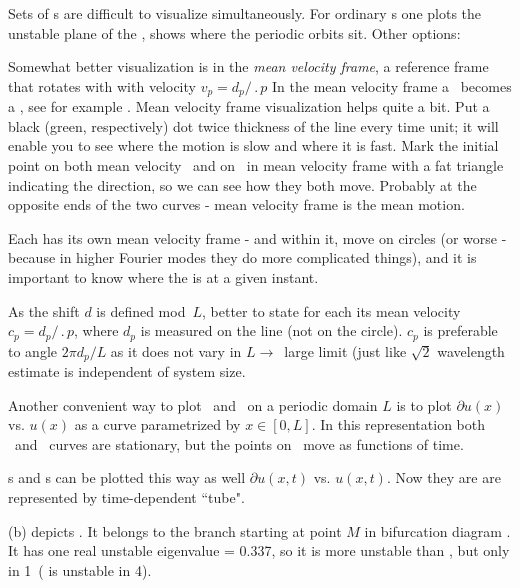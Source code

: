 Sets of \rpo s are difficult to visualize simultaneously.
For ordinary \po s one
plots the unstable plane of the \eqv, shows where the periodic
orbits sit. Other options:

Somewhat better visualization is in the
{\em mean velocity frame}, {\ie} 
a reference frame that rotates with with velocity 
$v_p=d_p/\period{p}$
In the mean velocity frame a \rpo\ becomes
a \po, see  for example .
Mean velocity frame visualization helps quite a bit.
Put a black (green, respectively) dot
twice thickness of the line every time unit; it will enable you to see
where the motion is slow and where it is fast.
Mark the initial point on both
mean velocity \rpo\ and on \eqv\  in mean velocity
 frame with a fat triangle
indicating the direction, so we can see how they both move. Probably at the
opposite ends of the two curves - mean velocity frame is the mean motion.


Each {\rpo} has its own mean velocity frame - and within it, {\eqv}
move on circles (or worse - because in higher Fourier modes they do more
complicated things), and it is important to know where the {\eqv} is at
a given instant.

As the shift $d$ is defined mod~$L$, better to
state for each {\rpo} its mean velocity $c_p = d_p/\period{p}$,
where $d_p$ is measured on the line (not on the circle). $c_p$ is
preferable to angle $2\pi d_p/L$ as it does not vary in $L \to$~large 
limit (just like $\sqrt{2}$ wavelength estimate is independent of
system size.

Another convenient way to plot \eqva\ and \reqva\ on a periodic
domain $L$ is to plot 
$\partial u(x)$ vs. $u(x)$ as a curve parametrized by
$x\in [0,L]$. In this representation both \eqva\ and \reqva\ curves are
stationary, but the points on \reqva\ move as functions of time.

\Po s and \rpo s can be plotted this way as well
$\partial u(x,t)$ vs. $u(x,t)$. Now they are are represented by time-dependent
``tube".

(b)
depicts .
It belongs to the branch starting at point $M$
in bifurcation diagram .
It has one real unstable eigenvalue = 0.337,
so it is more unstable than ,
but only in 1\dmn\ ( is unstable in 4\dmn).


